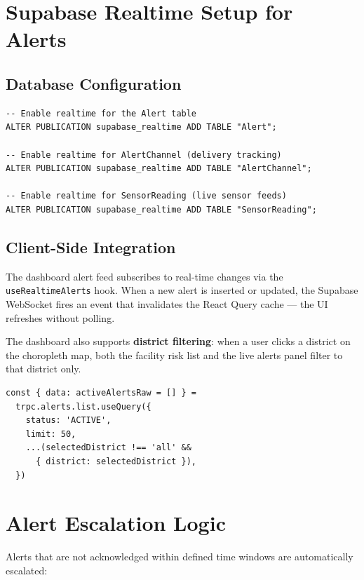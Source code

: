 \documentclass[12pt,a4paper]{report}
\begin{document}
\section{Supabase Realtime Setup for Alerts}

\subsection{Database Configuration}

\begin{lstlisting}[caption={Enable Realtime replication (run in Supabase SQL Editor)}]
-- Enable realtime for the Alert table
ALTER PUBLICATION supabase_realtime ADD TABLE "Alert";

-- Enable realtime for AlertChannel (delivery tracking)
ALTER PUBLICATION supabase_realtime ADD TABLE "AlertChannel";

-- Enable realtime for SensorReading (live sensor feeds)
ALTER PUBLICATION supabase_realtime ADD TABLE "SensorReading";
\end{lstlisting}

\subsection{Client-Side Integration}

The dashboard alert feed subscribes to real-time changes via the \texttt{useRealtimeAlerts} hook. When a new alert is inserted or updated, the Supabase WebSocket fires an event that invalidates the React Query cache --- the UI refreshes without polling.

The dashboard also supports \textbf{district filtering}: when a user clicks a district on the choropleth map, both the facility risk list and the live alerts panel filter to that district only.

\begin{lstlisting}[caption={Dashboard alert query with district filter}]
const { data: activeAlertsRaw = [] } =
  trpc.alerts.list.useQuery({
    status: 'ACTIVE',
    limit: 50,
    ...(selectedDistrict !== 'all' &&
      { district: selectedDistrict }),
  })
\end{lstlisting}

\section{Alert Escalation Logic}

Alerts that are not acknowledged within defined time windows are automatically escalated:
\end{document}
